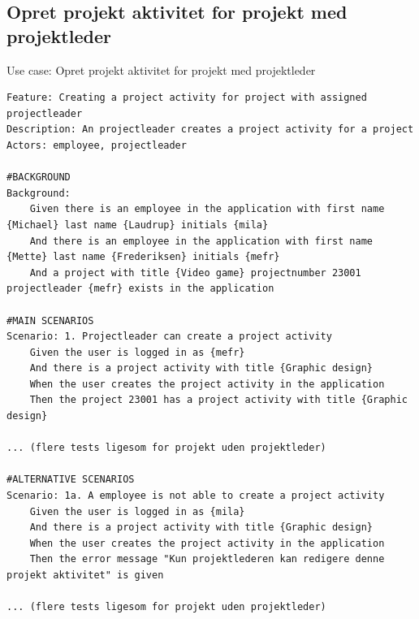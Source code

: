 \subsection{Opret projekt aktivitet for projekt med projektleder} 
\begin{listing}[H]
    \centering
    \caption{Use case: Opret projekt aktivitet for projekt med projektleder} \label{lst:usecase_regular_activity}
    \begin{verbatim}  
Feature: Creating a project activity for project with assigned projectleader
Description: An projectleader creates a project activity for a project
Actors: employee, projectleader

#BACKGROUND
Background:
    Given there is an employee in the application with first name {Michael} last name {Laudrup} initials {mila}
    And there is an employee in the application with first name {Mette} last name {Frederiksen} initials {mefr}
    And a project with title {Video game} projectnumber 23001 projectleader {mefr} exists in the application

#MAIN SCENARIOS
Scenario: 1. Projectleader can create a project activity
    Given the user is logged in as {mefr}
    And there is a project activity with title {Graphic design}  
    When the user creates the project activity in the application 
    Then the project 23001 has a project activity with title {Graphic design} 

... (flere tests ligesom for projekt uden projektleder)

#ALTERNATIVE SCENARIOS
Scenario: 1a. A employee is not able to create a project activity
    Given the user is logged in as {mila}
    And there is a project activity with title {Graphic design}  
    When the user creates the project activity in the application 
    Then the error message "Kun projektlederen kan redigere denne projekt aktivitet" is given
    
... (flere tests ligesom for projekt uden projektleder)

    \end{verbatim}
\end{listing}

